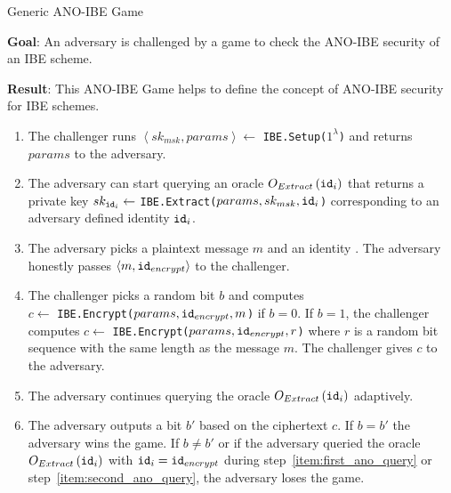 \begin{game}
\caption{Generic ANO-IBE Game~\cite{thesis:Alfredo08}}
\label{game:ano_ibe}
\begin{description}
 \item \textbf{Goal}: An adversary is challenged by a game to check the ANO-IBE security of an IBE scheme.
 
 \item \textbf{Result}: This ANO-IBE Game helps to define the concept of ANO-IBE security for IBE schemes.
\end{description}
 \begin{enumerate}
  \item The challenger runs $\left< sk_{msk}, params\right> \leftarrow$ \texttt{IBE.Setup($1^{\lambda}$)} and returns $params$ to the adversary.
  \item \label{item:first_ano_query} The adversary can start querying an oracle $O_{Extract} \left( \mathtt{id}_{i} \right)$ that returns a private key $sk_{\mathtt{id}_{i}} \leftarrow$ \texttt{IBE.Extract($params, sk_{msk}, \mathtt{id}_{i}$)} corresponding to an adversary defined identity $\mathtt{id}_{i}$.
  \item The adversary picks a plaintext message $m$ and an identity . The adversary honestly passes $\left< m, \mathtt{id}_{encrypt} \right>$ to the challenger.
  \item The challenger picks a random bit $b$ and computes \\ $c \leftarrow$ \texttt{IBE.Encrypt($params, \mathtt{id}_{encrypt}, m$)} if $b=0$. If $b=1$, the challenger computes $c \leftarrow$ \texttt{IBE.Encrypt($params, \mathtt{id}_{encrypt}, r$)} where $r$ is a random bit sequence with the same length as the message $m$. The challenger gives $c$ to the adversary.
  \item \label{item:second_ano_query} The adversary continues querying the oracle $O_{Extract} \left( \mathtt{id}_{i} \right)$ adaptively.
  \item The adversary outputs a bit $b'$ based on the ciphertext $c$. If $b = b'$ the adversary wins the game. If $b \neq b'$ or if the adversary queried the oracle $O_{Extract} \left( \mathtt{id}_{i} \right)$ with $\mathtt{id}_{i} = \mathtt{id}_{encrypt}$ during step~\ref{item:first_ano_query} or step~\ref{item:second_ano_query}, the adversary loses the game.
 \end{enumerate}
\end{game}

